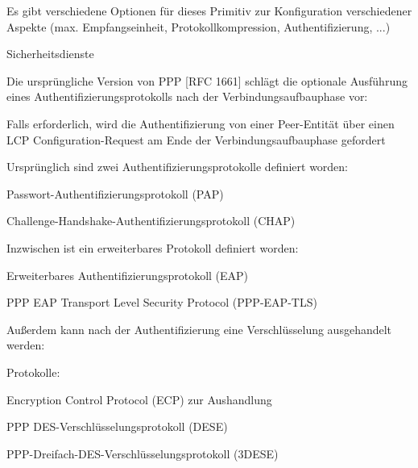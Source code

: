 \documentclass[a4paper]{article}
\begin{document}
\begin{multicols}{3}
\begin{itemize*}
            \begin{itemize*}
                  \item Es gibt verschiedene Optionen für dieses Primitiv zur Konfiguration verschiedener Aspekte (max. Empfangseinheit, Protokollkompression, Authentifizierung, ...)
            \end{itemize*}
      \end{itemize*}

      Sicherheitsdienste

      \begin{itemize*}
            \item
            Die ursprüngliche Version von PPP {[}RFC 1661{]} schlägt die optionale
            Ausführung eines Authentifizierungsprotokolls nach der
            Verbindungsaufbauphase vor:

            \begin{itemize*}
                  \item Falls erforderlich, wird die Authentifizierung von einer Peer-Entität über einen LCP Configuration-Request am Ende der Verbindungsaufbauphase gefordert
                  \item Ursprünglich sind zwei Authentifizierungsprotokolle definiert worden:
                  \begin{itemize*} \item Passwort-Authentifizierungsprotokoll (PAP) \item Challenge-Handshake-Authentifizierungsprotokoll (CHAP) \end{itemize*}
                  \item Inzwischen ist ein erweiterbares Protokoll definiert worden:
                  \begin{itemize*} \item Erweiterbares Authentifizierungsprotokoll (EAP) \item PPP EAP Transport Level Security Protocol (PPP-EAP-TLS) \end{itemize*}
            \end{itemize*}
            \item
            Außerdem kann nach der Authentifizierung eine Verschlüsselung
            ausgehandelt werden:

            \begin{itemize*}
                  \item Protokolle:
                  \begin{itemize*} \item Encryption Control Protocol (ECP) zur Aushandlung \item PPP DES-Verschlüsselungsprotokoll (DESE) \item PPP-Dreifach-DES-Verschlüsselungsprotokoll (3DESE) \end{itemize*}
            \end{itemize*}
      \end{itemize*}


\end{multicols}
\end{document}
